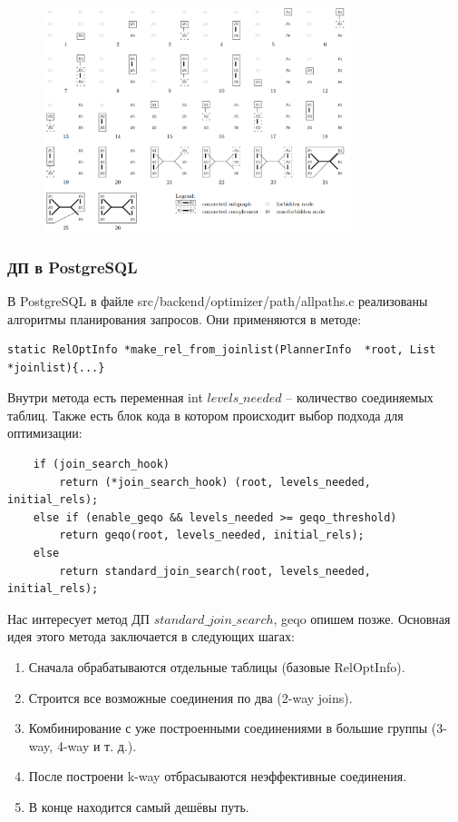 \documentclass[12pt]{article}
\begin{document}
\begin{flushleft}
\begin{figure}[H]
    \centering
    \includegraphics[width=0.8\textwidth]{image.png}
\end{figure}


\centering \subsubsection*{ДП в PostgreSQL}
\raggedright
В PostgreSQL в файле src/backend/optimizer/path/allpaths.c реализованы алгоритмы планирования запросов.
Они применяются в методе:
\begin{lstlisting}
static RelOptInfo *make_rel_from_joinlist(PlannerInfo  *root, List  *joinlist){...}
\end{lstlisting}

Внутри метода есть переменная int $levels\_needed$ -- количество соединяемых таблиц.
Также есть блок кода в котором происходит выбор подхода для оптимизации:
\begin{lstlisting}
    if (join_search_hook)
        return (*join_search_hook) (root, levels_needed, initial_rels);
    else if (enable_geqo && levels_needed >= geqo_threshold)
        return geqo(root, levels_needed, initial_rels);
    else
        return standard_join_search(root, levels_needed, initial_rels);
\end{lstlisting}

Нас интересует метод ДП $standard\_join\_search$, geqo опишем позже.
Основная идея этого метода заключается в следующих шагах:

\begin{enumerate}
    \item Сначала обрабатываются отдельные таблицы (базовые RelOptInfo).
    \item Строится все возможные соединения по два (2-way joins).
    \item Комбинирование с уже построенными соединениями в большие группы (3-way, 4-way и т. д.).
    \item После построени k-way отбрасываются неэффективные соединения.
    \item В конце находится самый дешёвы путь.
\end{enumerate}


\end{flushleft}
\end{document}
